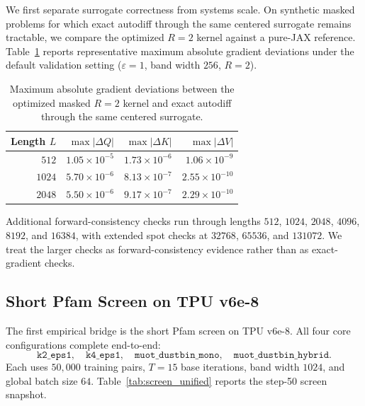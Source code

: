 \documentclass{article}
\begin{document}
We first separate surrogate correctness from systems scale. On synthetic masked problems for which exact autodiff through the same centered surrogate remains tractable, we compare the optimized $R=2$ kernel against a pure-JAX reference. Table~\ref{tab:exactness_unified} reports representative maximum absolute gradient deviations under the default validation setting ($\varepsilon=1$, band width $256$, $R=2$).

\begin{table}[h]
    \centering
    \begin{tabular}{@{}rrrr@{}}
        \toprule
        Length $L$ & $\max |\Delta Q|$ & $\max |\Delta K|$ & $\max |\Delta V|$ \\
        \midrule
        $512$ & $1.05 \times 10^{-5}$ & $1.73 \times 10^{-6}$ & $1.06 \times 10^{-9}$ \\
        $1024$ & $5.70 \times 10^{-6}$ & $8.13 \times 10^{-7}$ & $2.55 \times 10^{-10}$ \\
        $2048$ & $5.50 \times 10^{-6}$ & $9.17 \times 10^{-7}$ & $2.29 \times 10^{-10}$ \\
        \bottomrule
    \end{tabular}
    \caption{Maximum absolute gradient deviations between the optimized masked $R=2$ kernel and exact autodiff through the same centered surrogate.}
    \label{tab:exactness_unified}
\end{table}

Additional forward-consistency checks run through lengths $512$, $1024$, $2048$, $4096$, $8192$, and $16384$, with extended spot checks at $32768$, $65536$, and $131072$. We treat the larger checks as forward-consistency evidence rather than as exact-gradient checks.

\subsection{Short Pfam Screen on TPU v6e-8}

The first empirical bridge is the short Pfam screen on TPU v6e-8. All four core configurations complete end-to-end:
\[
\texttt{k2\_eps1},\quad
\texttt{k4\_eps1},\quad
\texttt{muot\_dustbin\_mono},\quad
\texttt{muot\_dustbin\_hybrid}.
\]
Each uses $50{,}000$ training pairs, $T=15$ base iterations, band width $1024$, and global batch size $64$. Table~\ref{tab:screen_unified} reports the step-50 screen snapshot.
\end{document}
